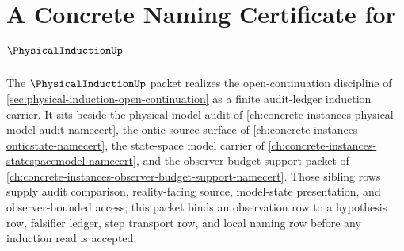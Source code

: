 \chapter{A Concrete Naming Certificate for $\PhysicalInductionUp$}
\label{ch:concrete-instances-physical-induction-namecert}

The $\PhysicalInductionUp$ packet realizes the open-continuation discipline of \autoref{sec:physical-induction-open-continuation} as a finite audit-ledger induction carrier. It sits beside the physical model audit of \autoref{ch:concrete-instances-physical-model-audit-namecert}, the ontic source surface of \autoref{ch:concrete-instances-onticstate-namecert}, the state-space model carrier of \autoref{ch:concrete-instances-statespacemodel-namecert}, and the observer-budget support packet of \autoref{ch:concrete-instances-observer-budget-support-namecert}. Those sibling rows supply audit comparison, reality-facing source, model-state presentation, and observer-bounded access; this packet binds an observation row to a hypothesis row, falsifier ledger, step transport row, and local naming row before any induction read is accepted.

